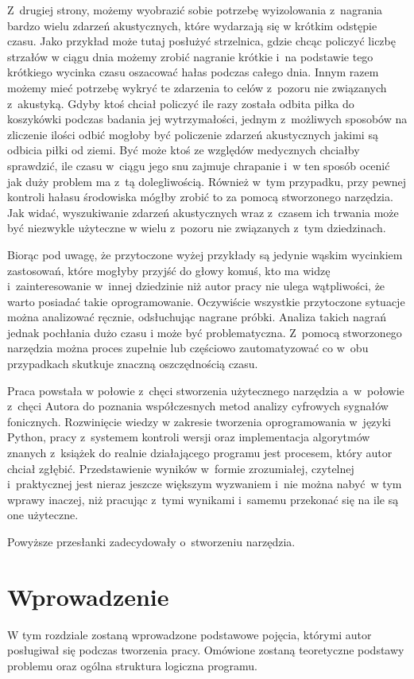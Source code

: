 \documentclass[eng,printmode]{mgr}
\begin{document}
Z~drugiej strony, możemy wyobrazić sobie potrzebę wyizolowania z~nagrania bardzo wielu zdarzeń akustycznych, które wydarzają się w krótkim odstępie czasu. Jako przykład może tutaj posłużyć strzelnica, gdzie chcąc policzyć liczbę strzałów w ciągu dnia możemy zrobić nagranie krótkie i~na podstawie tego krótkiego wycinka czasu oszacować hałas podczas całego dnia. Innym razem możemy mieć potrzebę wykryć te zdarzenia to celów z~pozoru nie związanych z~akustyką. Gdyby ktoś chciał policzyć ile razy została odbita piłka do koszykówki podczas badania jej wytrzymałości, jednym z~możliwych sposobów na zliczenie ilości odbić mogłoby być policzenie zdarzeń akustycznych jakimi są odbicia piłki od ziemi. Być może ktoś ze względów medycznych chciałby sprawdzić, ile czasu w~ciągu jego snu zajmuje chrapanie i~w ten sposób ocenić jak duży problem ma z~tą dolegliwością. Również w~tym przypadku, przy pewnej kontroli hałasu środowiska mógłby zrobić to za pomocą stworzonego narzędzia. Jak widać, wyszukiwanie zdarzeń akustycznych wraz z~czasem ich trwania może być niezwykle użyteczne w wielu z~pozoru nie związanych z~tym dziedzinach. 

Biorąc pod uwagę, że przytoczone wyżej przykłady są jedynie wąskim wycinkiem zastosowań, które mogłyby przyjść do głowy komuś, kto ma widzę i~zainteresowanie w~innej dziedzinie niż autor pracy nie ulega wątpliwości, że warto posiadać takie oprogramowanie. Oczywiście wszystkie przytoczone sytuacje można analizować ręcznie, odsłuchując nagrane próbki. Analiza takich nagrań jednak pochłania dużo czasu i może być problematyczna. Z~pomocą stworzonego narzędzia można proces zupełnie lub częściowo zautomatyzować co w~obu przypadkach skutkuje znaczną oszczędnością czasu. 

Praca powstała w połowie z~chęci stworzenia użytecznego narzędzia a~w~połowie z~chęci Autora do poznania współczesnych metod analizy cyfrowych sygnałów fonicznych. Rozwinięcie wiedzy w zakresie tworzenia oprogramowania w~języki Python, pracy z~systemem kontroli wersji oraz implementacja algorytmów znanych z~książek do realnie działającego programu jest procesem, który autor chciał zgłębić. Przedstawienie wyników w~formie zrozumiałej, czytelnej i~praktycznej jest nieraz jeszcze większym wyzwaniem i~nie można nabyć~w tym wprawy inaczej, niż pracując z~tymi wynikami i~samemu przekonać się na ile są one użyteczne.

Powyższe przesłanki zadecydowały o~stworzeniu narzędzia. 

\chapter{Wprowadzenie}
W tym rozdziale zostaną wprowadzone podstawowe pojęcia, którymi autor posługiwał się podczas tworzenia pracy. Omówione zostaną teoretyczne podstawy problemu oraz ogólna struktura logiczna programu.
\end{document}
